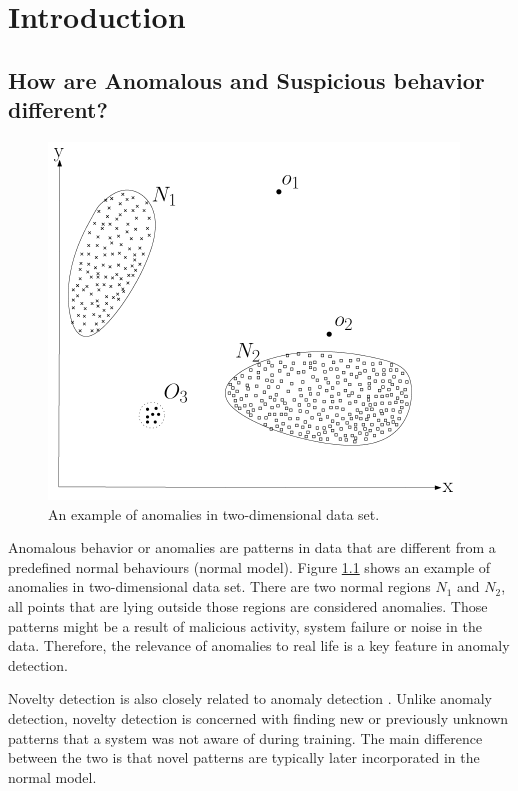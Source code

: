 \chapter{Introduction}\label{ch:introduction}

\section{How are Anomalous and Suspicious behavior different?}

\begin{figure}
  \includegraphics[width=\linewidth]{figures/Anomalies in 2D data.png}
  \caption{An example of anomalies in two-dimensional data set.}
  \label{fig:AnomaliesExample1}
\end{figure}

Anomalous behavior or anomalies are patterns in data that are different from a predefined normal behaviours (normal model). Figure \ref{fig:AnomaliesExample1} shows an example of anomalies in two-dimensional data set. There are two normal regions \(N_{1}\) and \(N_{2}\), all points that are lying outside those regions are considered anomalies. Those patterns might be a result of malicious activity, system failure or noise in the data. Therefore, the relevance of anomalies to real life is a key feature in anomaly detection.

Novelty detection is also closely related to anomaly detection \cite{n16,n17}. Unlike anomaly detection, novelty detection is concerned with finding new or previously unknown patterns that a system was not aware of during training. The main difference between the two is that novel patterns are typically later incorporated in the normal model.

